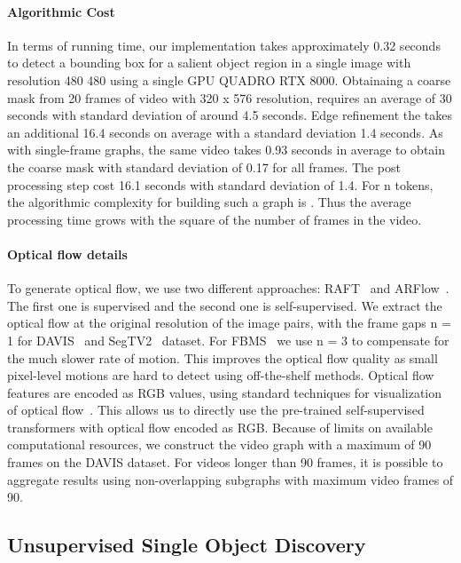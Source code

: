 \documentclass[twocolumn]{article}
\begin{document}
\paragraph*{Algorithmic Cost}
In terms of running time, our implementation takes approximately 0.32 seconds to detect a bounding box for a salient object region in a single image with resolution 480  480 using a single GPU QUADRO RTX 8000. Obtainaing a coarse mask from 20 frames of video with 320 x 576 resolution, requires an average of 30 seconds with standard deviation of around 4.5 seconds. 
Edge refinement the takes an additional 16.4 seconds on average with a standard deviation 1.4 seconds. As with single-frame graphs, the same video takes 0.93 seconds in average to obtain the coarse mask with standard deviation of 0.17 for all frames. The post processing step cost 16.1 seconds with standard deviation of 1.4.   For n tokens, the algorithmic complexity for building such a graph  is . Thus the average processing time grows with the square of the number of frames in the video.

\paragraph*{Optical flow details}
To generate optical flow, we use two different approaches: RAFT~\cite{teed2020raft} and ARFlow~\cite{liu2020learning}. The first one is supervised and the second one is self-supervised. We extract the optical ﬂow at the original resolution of the image pairs, with the frame gaps n = 1 for DAVIS~\cite{perazzi2016benchmark} and SegTV2~\cite{li2013video} dataset. For FBMS~\cite{ochs2013segmentation} we use n = 3 to compensate for the much slower rate of motion. This improves the optical flow quality as small pixel-level motions are hard to detect using off-the-shelf methods. Optical flow features are encoded as RGB values, using standard techniques for visualization of optical flow~\cite{baker2011database}. This allows us to directly use the pre-trained self-supervised transformers with optical flow encoded as RGB. 
Because of limits on available  computational resources, we construct the video graph with a maximum of 90 frames on the DAVIS dataset. For videos longer than 90 frames, it is possible to aggregate results using non-overlapping subgraphs with maximum video frames of 90. 

\subsection{Unsupervised Single Object Discovery}
\label{sec:unsupervised_object_discovery}
\end{document}
